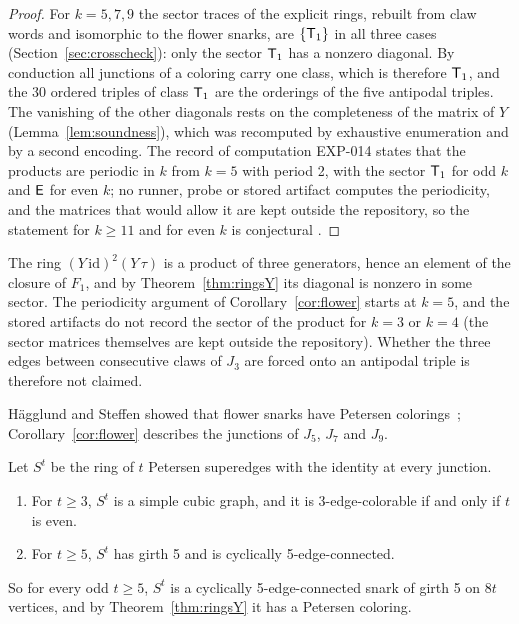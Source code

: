 \begin{proof}
For $k = 5, 7, 9$ the sector traces of the explicit rings, rebuilt from claw words and isomorphic to the flower snarks, are $\{\mathsf{T}_1\}$ in all three cases
(Section~\ref{sec:crosscheck}): only the sector $\mathsf{T}_1$ has a nonzero diagonal. By conduction all junctions of a coloring carry one class, which is therefore
$\mathsf{T}_1$, and the 30 ordered triples of class $\mathsf{T}_1$ are the orderings of the five
antipodal triples. The vanishing of the other diagonals rests on the completeness of the matrix of $Y$
(Lemma~\ref{lem:soundness}), which was recomputed by exhaustive enumeration and by a second encoding. The record of computation EXP-014 states that the
products are periodic in $k$ from $k = 5$ with period 2, with the sector $\mathsf{T}_1$ for odd $k$ and $\mathsf{E}$ for even $k$; no runner, probe or stored artifact computes the
periodicity, and the matrices that would allow it are kept outside the repository, so the statement for $k \ge 11$ and for even $k$ is conjectural .
\end{proof}

\begin{remark}[the case $k=3$]\label{rem:kthree}
The ring $(Y\,\mathrm{id})^{2}(Y\,\tau)$ is a product of three generators, hence an element of the closure of $F_1$, and by Theorem~\ref{thm:ringsY} its diagonal is nonzero in some
sector. The periodicity argument of Corollary~\ref{cor:flower} starts at $k = 5$, and the stored artifacts do not record the sector of the product for
$k = 3$ or $k = 4$ (the sector matrices themselves are kept outside the repository). Whether the three edges between consecutive claws of $J_3$ are forced onto an
antipodal triple is therefore not claimed.
\end{remark}

H\"agglund and Steffen showed that flower snarks have Petersen colorings~\cite{HS2014};
Corollary~\ref{cor:flower} describes the junctions of $J_5$, $J_7$ and $J_9$.

\begin{proposition}\label{prop:superedgerings}
Let $S^t$ be the ring of $t$ Petersen superedges with the identity at every junction.
\begin{enumerate}
\item[\textup{(a)}] For $t \ge 3$, $S^t$ is a simple cubic graph, and it is 3-edge-colorable if and
only if $t$ is even.
\item[\textup{(b)}] For $t \ge 5$, $S^t$ has girth 5 and is cyclically 5-edge-connected.
\end{enumerate}
So for every odd $t \ge 5$, $S^t$ is a cyclically 5-edge-connected snark of girth 5 on $8t$ vertices,
and by Theorem~\ref{thm:ringsY} it has a Petersen coloring.
\end{proposition}

